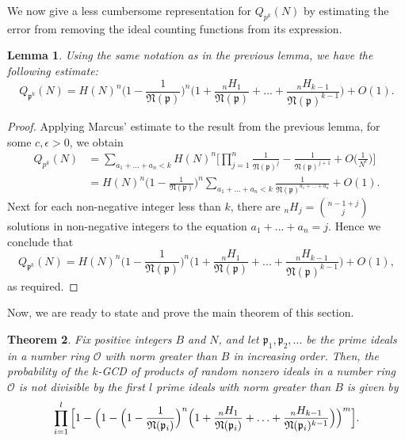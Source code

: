 \documentclass[10pt,a4paper]{article}
\newtheorem{theorem}{Theorem}[section]
\newtheorem{lemma}[theorem]{Lemma}
\theoremstyle{definition}
\theoremstyle{remark}
\newcommand{\f}[1]{\mathfrak{#1}}
\begin{document}
We now give a less cumbersome representation for $Q_{p^k}(N)$ by estimating the error from removing the ideal counting functions from its expression.

\begin{lemma}
	Using the same notation as in the previous lemma, we have the following estimate:
	$$Q_{\f{p}^k}(N) = H(N)^n\Big(1 - \frac{1}{\f{N}(\f{p})}\Big)^n \Big(1 + \frac{{}_nH_1}{\f{N}(\f{p})} + ... + \frac{{}_nH_{k-1}}{\f{N}(\f{p})^{k-1}}\Big) + O(1).$$
\end{lemma}

\begin{proof}
	Applying Marcus' estimate to the result from the previous lemma, for some $c,\epsilon>0$, we obtain
	\begin{align*} 
		Q_{p^k}(N) &= \sum_{a_1+...+a_n < k} H(N)^n\Big[\prod_{j=1}^n \frac{1}{\f{N}(\f{p})^j}-\frac{1}{\f{N}(\f{p})^{j+1}}+O\bigg(\frac{1}{N^\epsilon}\bigg)\Big]\\ 
		&= H(N)^n\Big(1 - \frac{1}{\f{N}(\f{p})}\Big)^n \sum_{a_1+...+a_n < k} \frac{1}{\f{N}(\f{p})^{a_1 + ... + a_n}} + O(1). 
	\end{align*} 
	\noindent Next for each non-negative integer less than $k$, there are \small${}_nH_j = \binom{n-1+j}{j}\ $ \normalsize  solutions in non-negative integers to the equation $a_1+...+a_n = j$. Hence we conclude that
	$$Q_{\f{p}^k}(N) = H(N)^n\Big(1 - \frac{1}{\f{N}(\f{p})}\Big)^n \Big(1 + \frac{{}_nH_1}{\f{N}(\f{p})} + ... + \frac{{}_nH_{k-1}}{\f{N}(\f{p})^{k-1}}\Big) + O(1),$$
	as required.
\end{proof}

Now, we are ready to state and prove the main theorem of this section.

\begin{theorem}
	Fix positive integers $B$ and $N$, and let $\f{p}_1, \f{p}_2, ...$ be the prime ideals in a number ring $\mathcal{O}$ with norm greater than $B$ in increasing order. Then, the probability of the $k$-GCD of products of random nonzero ideals in a number ring $\mathcal{O}$ is not divisible by the first $l$ prime ideals with norm greater than $B$ is given by 
	$$\prod_{i=1}^{l} \Big[1 - \Big(1 - \Big(1-\frac{1}{\mathfrak{N}(\f{p}_i)}\Big)^n \Big(1+\frac{{}_nH_1}{\f{N}(\f{p}_i)}+\mathellipsis+\frac{{}_nH_{k-1}}{\f{N}(\f{p}_i)^{k-1}}\Big)\Big)^m\Big].$$
\end{theorem}
\end{document}
